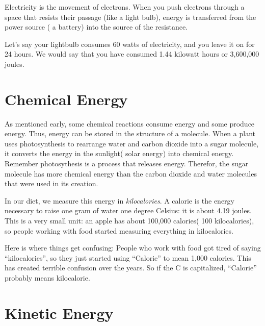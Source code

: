 Electricity is the movement of electrons. When you push electrons
through a space that resists their passage (like a light bulb),
energy is transferred from the power source ( a battery)
 into the source of the resistance.

Let's say your lightbulb consumes 60 watts of electricity, and you leave it on for 24 hours.
We would say that you have consumed 1.44 kilowatt hours or 3,600,000 joules.

\section{Chemical Energy}

As mentioned early, some chemical reactions consume energy and some
produce energy. Thus, energy can be stored in the structure of a
molecule. When a plant uses photosynthesis to rearrange water and
carbon dioxide into a sugar molecule, it converts the energy in
the sunlight( solar energy) into chemical energy. Remember photosythesis is a process that releases energy.
Therefor, the sugar molecule has more chemical energy than the carbon dioxide and water molecules that were
used in its creation.

In our diet, we measure this energy in \textit{kilocalories}. A
calorie is the energy necessary to raise one gram of water one degree
Celsius: it is about 4.19 joules. This is a very small unit: an apple
has about 100,000 calories( 100 kilocalories), so people working with food started
measuring everything in kilocalories.

Here is where things get confusing: People who work with food got tired of
saying ``kilocalories'', so they just started using ``Calorie'' to
mean 1,000 calories.  This has created terrible confusion over the
years. So if the C is capitalized, ``Calorie'' probably means kilocalorie.

\section{Kinetic Energy}

